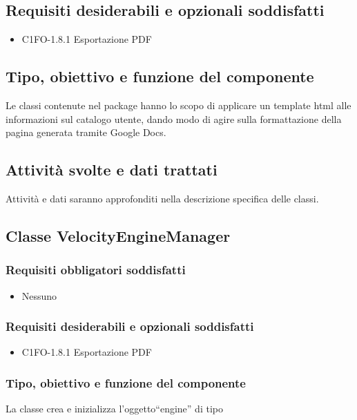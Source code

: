 \subsection*{Requisiti desiderabili e opzionali soddisfatti}
\begin{itemize}
    \item C1FO-1.8.1 Esportazione PDF
\end{itemize}
\subsection*{Tipo, obiettivo e funzione del componente}
Le classi contenute nel package hanno lo scopo di applicare un template html
alle informazioni sul catalogo utente, dando modo di agire sulla formattazione
della pagina generata tramite Google Docs.
\subsection*{Attivit\`a svolte e dati trattati}
 Attivit\`a e dati saranno approfonditi nella descrizione specifica delle
 classi.

\subsection{Classe VelocityEngineManager}
\subsubsection*{Requisiti obbligatori soddisfatti}
\begin{itemize}
  \item Nessuno
\end{itemize}
\subsubsection*{Requisiti desiderabili e opzionali soddisfatti}
\begin{itemize}
  \item C1FO-1.8.1 Esportazione PDF
\end{itemize}
\subsubsection*{Tipo, obiettivo e funzione del componente}
La classe crea e inizializza l'oggetto``engine'' di tipo 
